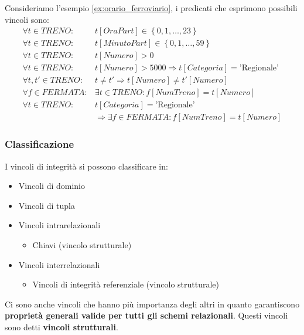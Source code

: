 \documentclass[a4paper,twoside]{article}
\begin{document}
\vspace{1em}
\noindent
\begin{example}
  Consideriamo l'esempio \ref{ex:orario_ferroviario}, i predicati che esprimono possibili
  vincoli sono:
  \[
    \begin{aligned}
      \forall t \in TRENO:& t[OraPart] \in \left\{ 0, 1, \ldots, 23 \right\}\\
      \forall t \in TRENO:& t[MinutoPart] \in \left\{ 0, 1, \ldots, 59 \right\}\\
      \forall t \in TRENO:& t[Numero] > 0\\
      \forall t \in TRENO:& t[Numero] > 5000 \Rightarrow t[Categoria] = \text{'Regionale'}\\
      \forall t, t' \in TRENO:& t \neq t' \Rightarrow t[Numero] \neq t'[Numero]\\
      \forall f \in FERMATA:& \exists t \in TRENO: f[NumTreno] = t[Numero]\\
        \forall t \in TRENO:& t[Categoria] = \text{'Regionale'}\\
                            & \Rightarrow \exists f \in FERMATA: f[NumTreno] = t[Numero]
    \end{aligned}
  \] 
\end{example}

\subsubsection{Classificazione}
I vincoli di integrità si possono classificare in:
\begin{itemize}
  \item Vincoli di dominio
  \item Vincoli di tupla
  \item Vincoli intrarelazionali
    \begin{itemize}
      \item Chiavi (vincolo strutturale)
    \end{itemize}
  \item Vincoli interrelazionali
    \begin{itemize}
      \item Vincoli di integrità referenziale (vincolo strutturale)
    \end{itemize}
\end{itemize}
Ci sono anche vincoli che hanno più importanza degli altri in quanto garantiscono
\textbf{proprietà generali valide per tutti gli schemi relazionali}. Questi
vincoli sono detti \textbf{vincoli strutturali}.
\end{document}
